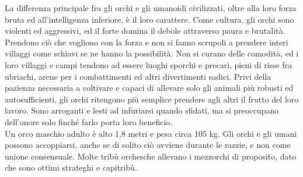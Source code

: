 \begin{multicols}{2}
La differenza principale fra gli orchi e gli umanoidi civilizzati, oltre alla loro forza bruta ed all'intelligenza inferiore, è il loro carattere. Come cultura, gli orchi sono violenti ed aggressivi, ed il forte domina il debole attraverso paura e brutalità. Prendono ciò che vogliono con la forza e non si fanno scrupoli a prendere interi villaggi come schiavi se ne hanno la possibilità. Non si curano delle comodità, ed i loro villaggi e campi tendono ad essere luoghi sporchi e precari, pieni di risse fra ubriachi, arene per i combattimenti ed altri divertimenti sadici. Privi della pazienza necessaria a coltivare e capaci di allevare solo gli animali più robusti ed autosufficienti, gli orchi ritengono più semplice prendere agli altri il frutto del loro lavoro. Sono arroganti e lesti ad infuriarsi quando sfidati, ma si preoccupano dell'onore solo finché farlo porta loro beneficio.\\

Un orco maschio adulto è alto 1,8 metri e pesa circa 105 kg. Gli orchi e gli umani possono accoppiarsi, anche se di solito ciò avviene durante le razzie, e non come unione consensuale. Molte tribù orchesche allevano i mezzorchi di proposito, dato che sono ottimi strateghi e capitribù.\\



\end{multicols}
